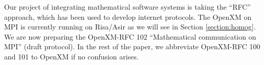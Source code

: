 Our project of integrating mathematical software
systems is taking the ``RFC'' approach, which has been
used to develop internet protocols.
The OpenXM on MPI \cite{MPI} is currently running on Risa/Asir
as we will see in Section \ref{section:homog}.
We are now preparing the OpenXM-RFC 102 ``Mathematical communication
on MPI'' (draft protocol).
In the rest of the paper, we abbreviate
OpenXM-RFC 100 and 101 to OpenXM if no confusion arises.




